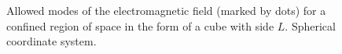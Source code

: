 \begin{figure}
\centering

\caption{Allowed modes of the electromagnetic field (marked by dots) for a confined
  region of space in the form of a cube with side $L$. Spherical
  coordinate system.}
\label{figCh1_pic4}
\end{figure}